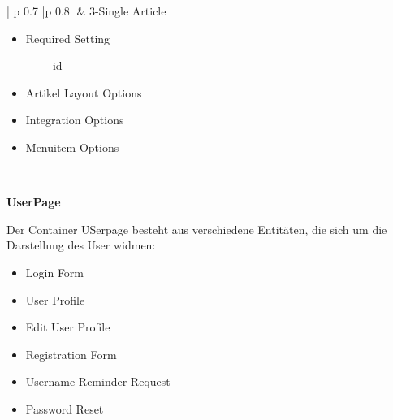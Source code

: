\begin{minipage}{0.7\textwidth}
\begin{longtable}{| p {0.7\textwidth} |p {0.8\textwidth}|}
&
3-Single Article
 \begin{itemize}
 	\item Required  Setting
 		\begin{enumerate}
 		\item[-] id
 		\end{enumerate}
 	\item Artikel Layout Options
    \item Integration Options
    \item Menuitem Options 	
\end{itemize}
\\ \hline
\end{longtable}
\end{minipage}



\textbf{UserPage}

Der Container USerpage besteht aus verschiedene Entitäten, die sich um die Darstellung des User widmen:
\begin{itemize}
	\item Login Form
	\item User Profile
	\item Edit User Profile
	\item Registration Form
	\item Username Reminder Request
	\item Password Reset
\end{itemize}


